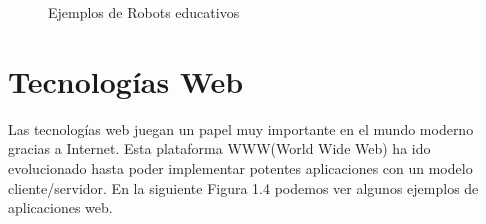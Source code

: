 \begin{figure}
 \centering
 \caption{Ejemplos de Robots educativos}
 \label{f:robotseducativos}
\end{figure}


\section{Tecnologías Web}
Las tecnologías web juegan un papel muy importante en el mundo moderno gracias a Internet. Esta plataforma WWW(World Wide Web) 
ha ido evolucionado hasta poder implementar potentes aplicaciones con un modelo cliente/servidor. En la siguiente Figura 1.4 podemos ver algunos ejemplos de aplicaciones web.

